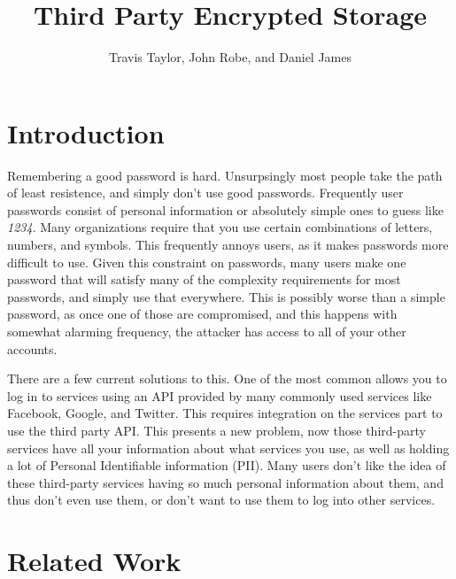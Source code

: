 \documentclass[letterpaper,twocolumn,10pt]{article}
\title{Third Party Encrypted Storage}
\author{Travis Taylor, John Robe, and Daniel James}
\affil{School of Computing, University of Utah}
\begin{document}
\lstset{style=codestyle}


\maketitle

\section{Introduction}

Remembering a good password is hard. Unsurpsingly most people take the path of least resistence, and simply don't use good passwords. Frequently user passwords consist of personal information or absolutely simple ones to guess like \textit{1234}\cite{easypass}. Many organizations require that you use certain combinations of letters, numbers, and symbols. This frequently annoys users, as it makes passwords more difficult to use. Given this constraint on passwords, many users make one password that will satisfy many of the complexity requirements for most passwords, and simply use that everywhere. This is possibly worse than a simple password, as once one of those are compromised, and this happens with somewhat alarming frequency\cite{databreach}, the attacker has access to all of your other accounts.

There are a few current solutions to this. One of the most common allows you to log in to services using an API provided by many commonly used services like Facebook, Google, and Twitter. This requires integration on the services part to use the third party API. This presents a new problem, now those third-party services have all your information about what services you use, as well as holding a lot of Personal Identifiable information (PII). Many users don't like the idea of these third-party services having so much personal information about them, and thus don't even use them, or don't want to use them to log into other services.


\section{Related Work}
\end{document}
